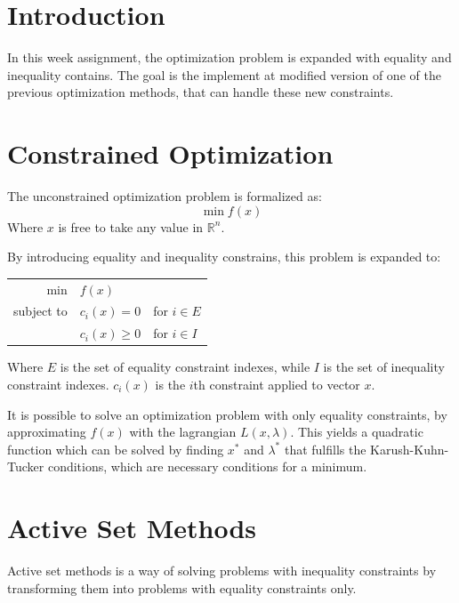 \documentclass[10pt,oneside,a4paper,final,english]{memoir}
\begin{document}




\maketitle
\newpage

\section{Introduction}
In this week assignment, the optimization problem is expanded with
equality and inequality contains. The goal is the implement at
modified version of one of the previous optimization methods, that can
handle these new constraints.


\section{Constrained Optimization}
The unconstrained optimization problem is formalized as:
\[
\min f(x)
\]
Where $x$ is free to take any value in $\mathbb{R}^n$.

By introducing equality and inequality constrains, this problem is
expanded to:
\begin{center}\begin{tabular}{rll}
min & $f(x)$ & \\
subject to & $c_i(x) = 0$    & for $i \in E$\\
           & $c_i(x) \geq 0$ & for $i \in I$
\end{tabular}\end{center}

Where $E$ is the set of equality constraint indexes, while $I$ is the
set of inequality constraint indexes. $c_i(x)$ is the $i$th
constraint applied to vector $x$.

It is possible to solve an optimization problem with only equality
constraints, by approximating $f(x)$ with the lagrangian
$L(x,\lambda)$. This yields a quadratic function which can be
solved by finding $x^*$ and $\lambda^*$ that fulfills the
Karush-Kuhn-Tucker conditions, which are necessary conditions for a
minimum.


\section{Active Set Methods}
Active set methods is a way of solving problems with inequality
constraints by transforming them into problems with equality
constraints only.
\end{document}
